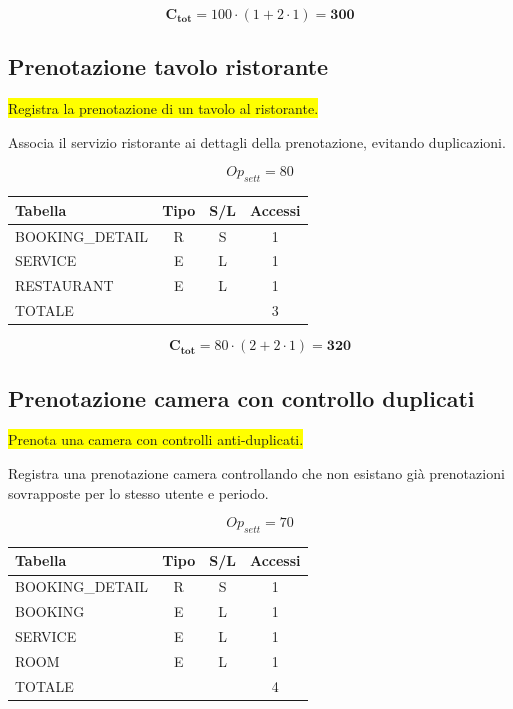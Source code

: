 \documentclass[a4paper,12pt]{report}
\begin{document}
$$\mathbf{C_{tot}} = 100 \cdot (1 + 2 \cdot 1) = \mathbf{300}$$

\subsection*{Prenotazione tavolo ristorante} \label{op14}
\colorbox{yellow}{Registra la prenotazione di un tavolo al ristorante.}

Associa il servizio ristorante ai dettagli della prenotazione,
evitando duplicazioni.

$$Op_{sett} = 80$$

\begin{table}[H]
  \centering
  \small
  \renewcommand{\arraystretch}{1.15}
  \begin{tabularx}{0.7\textwidth}{|X|c|c|c|}
    \hline
    \rowcolor{gray!20}
    \textbf{Tabella} & \textbf{Tipo} & \textbf{S/L} & \textbf{Accessi} \\
    \hline
    BOOKING\_DETAIL & R & S & 1 \\
    SERVICE & E & L & 1 \\
    RESTAURANT & E & L & 1 \\
    \hline
    \rowcolor{gray!20}
    TOTALE & & & 3 \\
    \hline
  \end{tabularx}
  \vspace{-1em}
\end{table}

$$\mathbf{C_{tot}} = 80 \cdot (2 + 2 \cdot 1) = \mathbf{320}$$

\subsection*{Prenotazione camera con controllo duplicati} \label{op15}
\colorbox{yellow}{Prenota una camera con controlli anti-duplicati.}

Registra una prenotazione camera controllando che non esistano già
prenotazioni sovrapposte per lo stesso utente e periodo.

$$Op_{sett} = 70$$

\begin{table}[H]
  \centering
  \small
  \renewcommand{\arraystretch}{1.15}
  \begin{tabularx}{0.7\textwidth}{|X|c|c|c|}
    \hline
    \rowcolor{gray!20}
    \textbf{Tabella} & \textbf{Tipo} & \textbf{S/L} & \textbf{Accessi} \\
    \hline
    BOOKING\_DETAIL & R & S & 1 \\
    BOOKING & E & L & 1 \\
    SERVICE & E & L & 1 \\
    ROOM & E & L & 1 \\
    \hline
    \rowcolor{gray!20}
    TOTALE & & & 4 \\
    \hline
  \end{tabularx}
  \vspace{-1em}
\end{table}
\end{document}
